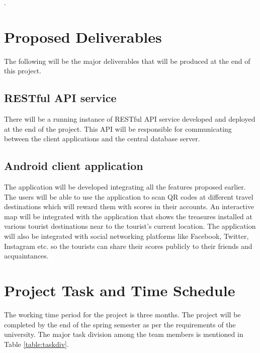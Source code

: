 \documentclass[12pt, a4paper, oneside]{article}
\begin{document}
\pagebreak
. \pagebreak
\section{Proposed Deliverables}
The following will be the major deliverables that will be produced at the end of this project.

\subsection{RESTful API service}
There will be a running instance of RESTful API service developed and deployed at the end of the project. This API will be responsible for communicating between the client applications and the central database server.

\subsection{Android client application}
The application will be developed integrating all the features proposed earlier. The users will be able to use the application to scan QR codes at different travel destinations which will reward them with scores in their accounts. An interactive map will be integrated with the application that shows the treasures installed at various tourist destinations near to the tourist's current location. The application will also be integrated with social networking platforms like Facebook, Twitter, Instagram etc. so the tourists can share their scores publicly to their friends and acquaintances. 

\break
\section{Project Task and Time Schedule}
The working time period for the project is three months. The project will be completed by the end of the spring semester as per the requirements of the university. The major task division among the team members is mentioned in Table \ref{table:taskdiv}.
\end{document}
